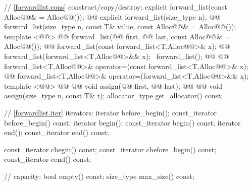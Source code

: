 \documentclass[american,twoside]{book}
\begin{document}
\begin{codeblock}
{{    // \ref{forwardlist.cons} construct/copy/destroy: 
    explicit forward_list(const Alloc@@& = Alloc@@()); 
    @@ 
      explicit forward_list(size_type n);
    @@ 
      forward_list(size_type n, const T& value, 
                   const Alloc@@& = Alloc@@()); 
    template <@@>
      @@
      forward_list(@@ first, @@ last, 
                   const Alloc@@& = Alloc@@()); 
    @@ 
      forward_list(const forward_list<T,Alloc@@>& x);
    @@ forward_list(forward_list<T,Alloc@@>&& x);
    ~forward_list(); 
    @@ @@
      forward_list<T,Alloc@@>& operator=(const forward_list<T,Alloc@@>& x);
    @@
      forward_list<T,Alloc@@>& operator=(forward_list<T,Alloc@@>&& x); 
    template <@@> 
      @@
            @@
      void assign(@@ first, @@ last); 
    @@ @@
      void assign(size_type n, const T& t); 
    allocator_type get_allocator() const; 

    // \ref{forwardlist.iter} iterators:
    iterator before_begin();
    const_iterator before_begin() const;
    iterator begin(); 
    const_iterator begin() const; 
    iterator end(); 
    const_iterator end() const;

    const_iterator cbegin() const;
    const_iterator cbefore_begin() const;
    const_iterator cend() const;

    // capacity: 
    bool empty() const; 
    size_type max_size() const;

}}
\end{codeblock}
\end{document}
